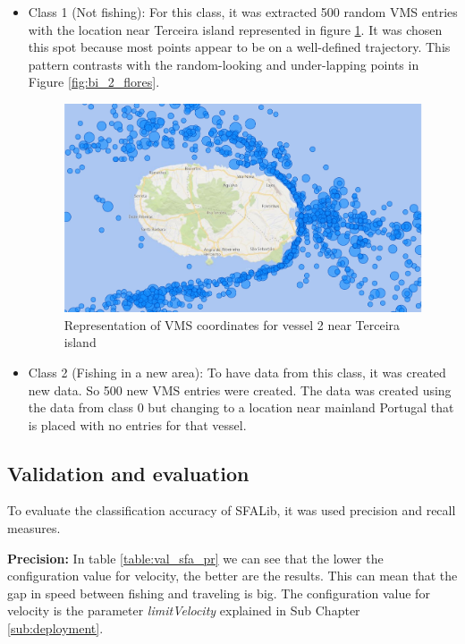 \begin{itemize}
\item Class 1 (Not fishing): For this class, it was extracted 500 random VMS entries with the location near Terceira island represented in figure \ref{fig:bi_2_travel}. It was chosen this spot because most points appear to be on a well-defined trajectory. This pattern contrasts with the random-looking and under-lapping points in Figure \ref{fig:bi_2_flores}. 

\begin{figure}[]
\centering
\includegraphics[width=0.8\linewidth]{Chapters/img/2viagem.pdf}
\caption{Representation of VMS coordinates for vessel 2 near Terceira island}
\label{fig:bi_2_travel}
\end{figure}



\item Class 2 (Fishing in a new area): To have data from this class, it was created new data. So 500 new VMS entries were created. The data was created using the data from class 0 but changing to a location near mainland Portugal that is placed with no entries for that vessel. 

\end{itemize}




\subsection{Validation and evaluation}
\label{sec:val_SFA_val_eva}

To evaluate the classification accuracy of SFALib, it was used precision and recall measures.

\textbf{Precision:} %
In table \ref{table:val_sfa_pr} we can see that the lower the configuration value for velocity, the better are the results. 
This can mean that the gap in speed between fishing and traveling is big.
The configuration value for velocity is the parameter \emph{limitVelocity} explained in Sub Chapter \ref{sub:deployment}.



